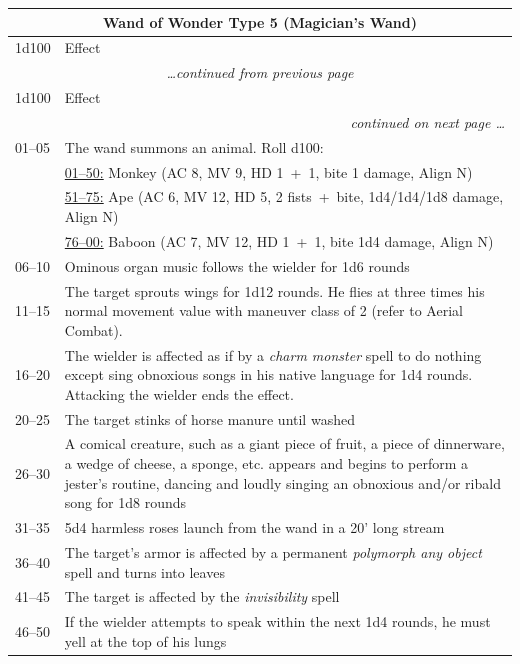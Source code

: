 \noindent \begin{longtable}{|p{}|p{}|}
\multicolumn{2}{c}{Wand of Wonder Type 5 (Magician's Wand)} \\
\hline
1d100	& Effect \\
\hline\hline
\endfirsthead
\multicolumn{2}{c}{\textit{\ldots continued from previous page}} \\
\hline
1d100	& Effect \\
\hline\hline
\endhead
\hline
\multicolumn{2}{r}{\textit{continued on next page \ldots}}\\
\endfoot
\hline
\endlastfoot
\rowcolor[gray]{.9}01--05	& The wand summons an animal.  Roll d100: \\
\rowcolor[gray]{.9}		& \underline{01--50:} Monkey (AC 8, MV 9, HD 1~+~1, bite 1 damage, Align N) \\
\rowcolor[gray]{.9}		& \underline{51--75:} Ape (AC 6, MV 12, HD 5, 2 fists~+~bite, 1d4/1d4/1d8 damage, Align N) \\
\rowcolor[gray]{.9}		& \underline{76--00:} Baboon (AC 7, MV 12, HD 1~+~1, bite 1d4 damage, Align N) \\
06--10	& Ominous organ music follows the wielder for 1d6 rounds \\
\rowcolor[gray]{.9}11--15	& The target sprouts wings for 1d12 rounds.  He flies at three times his normal movement value with maneuver class of 2 (refer to Aerial Combat).   \\
16--20	& The wielder is affected as if by a \textit{charm monster} spell to do nothing except sing obnoxious songs in his native language for 1d4 rounds.  Attacking the wielder ends the effect.  \\
\rowcolor[gray]{.9}20--25	& The target stinks of horse manure until washed \\
26--30	& A comical creature, such as a giant piece of fruit, a piece of dinnerware, a wedge of cheese, a sponge, etc. appears and begins to perform a jester's routine, dancing and loudly singing an obnoxious and/or ribald song for 1d8 rounds \\
\rowcolor[gray]{.9}31--35	& 5d4 harmless roses launch from the wand in a 20' long stream  \\
36--40	& The target's armor is affected by a permanent \textit{polymorph any object} spell and turns into leaves \\
\rowcolor[gray]{.9}41--45	& The target is affected by the \textit{invisibility} spell \\
46--50	& If the wielder attempts to speak within the next 1d4 rounds, he must yell at the top of his lungs \\

\end{longtable}
